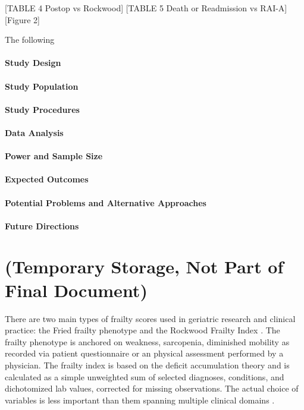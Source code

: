 [TABLE 4 Postop vs Rockwood]
[TABLE 5 Death or Readmission vs RAI-A] [Figure 2]

The following 

\paragraph{Study Design}\label{study-design}


\paragraph{Study Population}\label{study-population}


\paragraph{Study Procedures}\label{study-procedures}


\paragraph{Data Analysis}\label{data-analysis}

\paragraph{Power and Sample Size}\label{power-and-sample-size}

\paragraph{Expected Outcomes}\label{expected-outcomes}

\paragraph{Potential Problems and Alternative
      Approaches}\label{potential-problems-and-alternative-approaches}

\paragraph{Future Directions}\label{future-directions} 
    
\section{(Temporary Storage, Not Part of Final Document)}\label{ammo}
There are two main types of frailty scores used in geriatric research and clinical practice: the Fried frailty phenotype \cite{Fried_2001} and the Rockwood Frailty Index \cite{Mitnitski_2001}. The frailty phenotype is anchored on weakness, sarcopenia, diminished mobility as recorded via patient questionnaire or an physical assessment performed by a physician. The frailty index is based on the deficit accumulation theory and is calculated as a simple unweighted sum of selected diagnoses, conditions, and dichotomized lab values, corrected for missing observations. The actual choice of variables is less important than them spanning multiple clinical domains \cite{Searle_2008}. 


